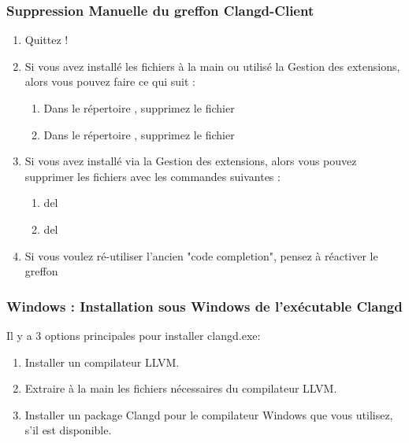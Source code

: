 \subsubsection{Suppression Manuelle du greffon Clangd-Client}

\begin{enumerate}[noitemsep]
\item Quittez \codeblocks \hspace{0pt} !
\item Si vous avez installé les fichiers à la main ou utilisé la Gestion des extensions, alors vous pouvez faire ce qui suit :
    \begin{enumerate}[noitemsep]
    \item Dans le répertoire \codeblocks {}, supprimez le fichier 
    \item Dans le répertoire \codeblocks {}, supprimez le fichier 
    \end{enumerate}
\item Si vous avez installé via la Gestion des extensions, alors vous pouvez supprimer les fichiers avec les commandes suivantes :
    \begin{enumerate}[noitemsep]
    \item del 
    \item del 
    \end{enumerate}
\item Si vous voulez ré-utiliser l'ancien "code completion", pensez à réactiver le greffon
\end{enumerate}


\subsubsection{Windows : Installation sous Windows de l'exécutable Clangd}\label{sec:win_install}

Il y a 3 options principales pour installer clangd.exe:
\begin{enumerate}[noitemsep]
\item Installer un compilateur LLVM.
\item Extraire à la main les fichiers nécessaires du compilateur LLVM.
\item Installer un package Clangd pour le compilateur Windows que vous utilisez, s'il est disponible.
\end{enumerate}

